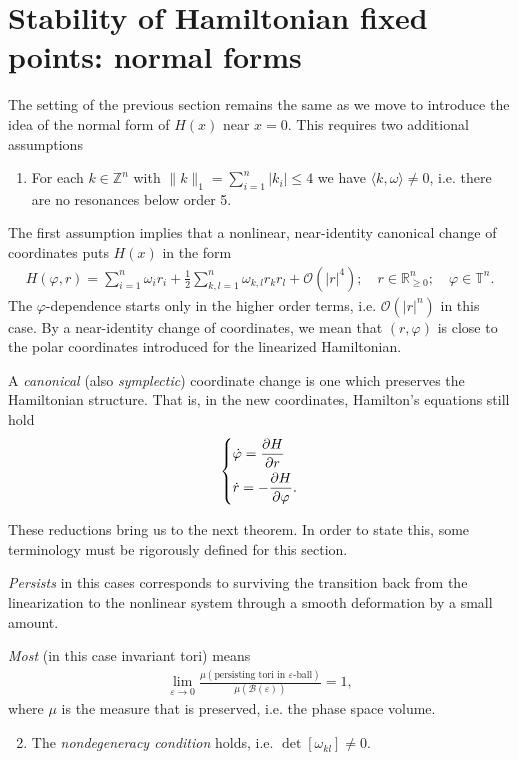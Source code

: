 \section{Stability of Hamiltonian fixed points: normal forms}
The setting of the previous section remains the same as we move to introduce the idea of the normal form of $H(x)$ near $x=0$. This requires two additional assumptions
\begin{enumerate}
	\item For each $k\in \mathbb{Z}^{n}$ with $\|k\|_{1} = \sum_{i=1}^{n} |k_i| \leq 4$ we have $\langle k, \omega \rangle \neq 0$, i.e. there are no resonances below order 5.
\end{enumerate}
The first assumption implies that a nonlinear, near-identity canonical change of coordinates puts $H(x)$ in the form
\begin{align}
	H(\varphi, r) = \sum_{i=1}^{n} \omega_i r_i + \frac{1}{2}\sum_{k,l=1}^{n} \omega_{k,l}r_{k}r_{l} + \mathcal{O}\left(|r|^{4}\right);\quad r \in \mathbb{R}^{n}_{\geq 0};\quad \varphi \in \mathbb{T}^{n}.
\end{align}
The $\varphi$-dependence starts only in the higher order terms, i.e. $\mathcal{O}\left( |r|^{n}\right)$ in this case. By a near-identity change of coordinates, we mean that $(r,\varphi)$ is close to the polar coordinates introduced for the linearized Hamiltonian.

\begin{definition}
	A \emph{canonical} (also \emph{symplectic}) coordinate change is one which preserves the Hamiltonian structure. That is, in the new coordinates, Hamilton's equations still hold
	\begin{align}
		\begin{dcases}
		\dot{\varphi} = \frac{\partial H}{\partial r} \\
		\dot{r} = -\frac{\partial H}{\partial \varphi}.
		\end{dcases}
	\end{align}
\end{definition}

These reductions bring us to the next theorem. In order to state this, some terminology must be rigorously defined for this section.
\begin{definition}
	\emph{Persists} in this cases corresponds to surviving the transition back from the linearization to the nonlinear system through a smooth deformation by a small amount.
\end{definition}
\begin{definition}
	\emph{Most} (in this case invariant tori) means 
	\begin{align}
		\lim_{\varepsilon \to 0} \frac{\mu ( \textrm{persisting tori in } \varepsilon  \textrm{-ball} )}{\mu (\mathcal{B}(\varepsilon))} = 1,
	\end{align}
	where $\mu $ is the measure that is preserved, i.e. the phase space volume.
\end{definition}
\begin{enumerate}
	\setcounter{enumi}{1}
	\item The \emph{nondegeneracy condition} holds, i.e. $\det[\omega_{kl}]\neq 0$.
\end{enumerate}

